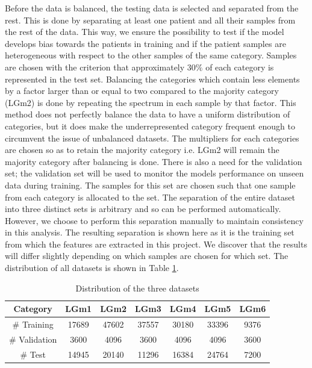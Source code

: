 Before the data is balanced, the testing data is selected and separated from the rest. This is done by separating at least one patient and all their samples from the rest of the data. This way, we ensure the possibility to test if the model develops bias towards the patients in training and if the patient samples are heterogeneous with respect to the other samples of the same category. Samples are chosen with the criterion that approximately $30\%$ of each category is represented in the test set. Balancing the categories which contain less elements by a factor larger than or equal to two compared to the majority category (LGm2) is done by repeating the spectrum in each sample by that factor. This method does not perfectly balance the data to have a uniform distribution of categories, but it does make the underrepresented category frequent enough to circumvent the issue of unbalanced datasets. The multipliers for each categories are chosen so as to retain the majority category i.e. LGm2 will remain the majority category after balancing is done. There is also a need for the validation set; the validation set will be used to monitor the models performance on unseen data during training. The samples for this set are chosen such that one sample from each category is allocated to the set. The separation of the entire dataset into three distinct sets is arbitrary and so can be performed automatically. However, we choose to perform this separation manually to maintain consistency in this analysis. The resulting separation is shown here as it is the training set from which the features are extracted in this project. We discover that the results will differ slightly depending on which samples are chosen for which set. The distribution of all datasets is shown in Table \ref{table:2}.

\begin{table}[H]
\centering
 \begin{tabular}{||c c c c c c c||} 
 \hline
 Category & LGm1 & LGm2 & LGm3 & LGm4 & LGm5 & LGm6 \\ [0.5ex] 
 \hline\hline
 \# Training & 17689 & 47602 & 37557 & 30180 & 33396 & 9376 \\
 \hline 
 \# Validation & 3600 & 4096 & 3600 & 4096 & 4096 & 3600 \\
 \hline
 \# Test & 14945 & 20140 & 11296 & 16384 & 24764 & 7200 \\
 \hline

\end{tabular}
\caption{Distribution of the three datasets}
\label{table:2}
\end{table}

